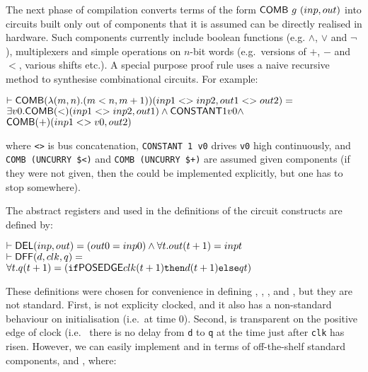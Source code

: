 The next phase of compilation converts terms of the form $\mathsf{COMB}~g~(inp,out)$
into circuits built only out of components that it is assumed can be directly realised in
hardware. Such components  currently include boolean functions (e.g. $\wedge$,
$\vee$ and $\neg$), multiplexers and simple operations  on $n$-bit words (e.g.~versions
of $+$, $-$ and $<$, various shifts etc.). 
A special purpose proof rule uses a naive recursive method to synthesise
combinational circuits. For example:

\vspace*{-2mm}

{\begin{alltt}
\( \vdash \DEF{COMB}({\lambda}(m,n). (m<n, m+1))(inp1<>inp2,out1<>out2) =              \)
\(     {\exists}v0. \DEF{COMB}({<})(inp1<>inp2,out1) \wedge \DEF{CONSTANT} 1 v0 \wedge \)
\(          \DEF{COMB}({+})(inp1<>v0,out2)                                              \)
\end{alltt}}
\vspace*{-2mm}

\noindent where {\verb+<>+} is bus concatenation,
{\verb+CONSTANT 1 v0+} drives \texttt{v0} high continuously, and
{\verb+COMB (UNCURRY $<)+} and {\verb&COMB (UNCURRY $+)&} are assumed
given components (if they were not given, then the could be
implemented explicitly, but one has to stop somewhere). 
 
The abstract registers  and  used in the definitions of
the circuit constructs are defined by:

\vspace*{-2mm}

{\begin{alltt}
\( \vdash \DEF{DEL}(inp,out) = (out 0 = inp 0) \wedge {\forall}t. out(t+1) = inp t                       \)
\( \vdash \DEF{DFF}(d,clk,q) =                                                                           \)
\(     {\forall}t. q(t+1) = (\texttt{if} \DEF{POSEDGE} clk (t+1) \texttt{then} d(t+1) \texttt{else} q t) \)
\end{alltt}}

\vspace*{-2mm}

These definitions were chosen for convenience in defining
, , ,  and , but they are not standard.
First,  is not explicity clocked, and it also has a
non-standard behaviour on initialisation (i.e.~at time $0$).  Second,
 is transparent on the positive edge of clock (i.e.~ there is
no delay from \texttt{d} to
\texttt{q} at the time just after \texttt{clk} has risen. 
However, we can easily implement  and  in terms of off-the-shelf
standard components,   and , where:

